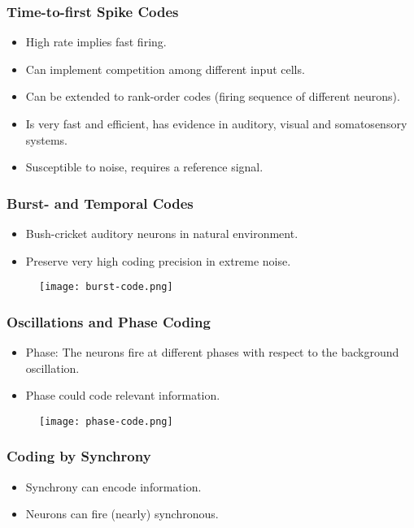 \documentclass[main]{subfiles}
\begin{document}
\subsubsection{Time-to-first Spike Codes}
\begin{itemize}[noitemsep,nolistsep]
	\item High rate implies fast firing.
	\item Can implement competition among different input cells.
	\item Can be extended to rank-order codes (firing sequence of different neurons).
	\item Is very fast and efficient, has evidence in auditory, visual and somatosensory systems.
	\item Susceptible to noise, requires a reference signal.
\end{itemize}

\subsubsection{Burst- and Temporal Codes}
\begin{itemize}[noitemsep,nolistsep]
	\item Bush-cricket auditory neurons in natural environment.
	\item Preserve very high coding precision in extreme noise.
\end{itemize}
\begin{figure}[H]
	\centering
	\texttt{[image: burst-code.png]}
\end{figure}

\subsubsection{Oscillations and Phase Coding}
\begin{itemize}[noitemsep,nolistsep]
	\item Phase: The neurons fire at different phases with respect to the background oscillation.
	\item Phase could code relevant information.
\end{itemize}
\begin{figure}[H]
	\centering
	\texttt{[image: phase-code.png]}
\end{figure}

\subsubsection{Coding by Synchrony}
\begin{itemize}[noitemsep,nolistsep]
	\item Synchrony can encode information.
	\item Neurons can fire (nearly) synchronous.
\end{itemize}
\end{document}
